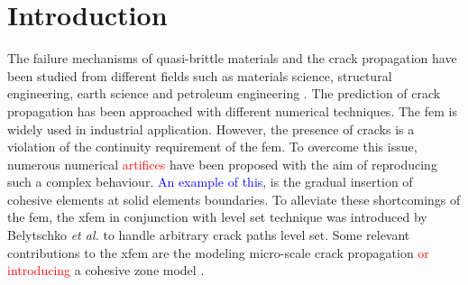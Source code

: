 \documentclass[preprint,12pt,a4paper]{elsarticle}
\begin{document}
\section{Introduction}
\label{sec:1}
The failure mechanisms of quasi-brittle materials and the  crack propagation have been studied from different fields such as materials science, structural engineering, earth science and petroleum engineering . The prediction of crack propagation has been approached with different numerical techniques. The \acrfull{fem} is widely used in industrial application. However, the presence of cracks is a violation of the continuity requirement of the \acrshort{fem}. To overcome this issue, numerous numerical \textcolor{red}{artifices} have been proposed with the aim of reproducing such a
complex behaviour. \textcolor{blue}{An example of this}, is the gradual insertion of cohesive elements \cite{Ortiz_1999} at solid elements boundaries. To alleviate these shortcomings of the \acrshort{fem}, the \acrfull{xfem} in conjunction with level set technique was introduced by Belytschko {\it et al.}
\cite{Belytschko_03} to handle arbitrary crack paths level
set. Some relevant contributions to the \acrshort{xfem} are the
modeling micro-scale crack propagation \cite{HUANG_2018} \textcolor{red}{or introducing} a cohesive zone model \cite{NAGASHIMA_2016}.\\
\end{document}
